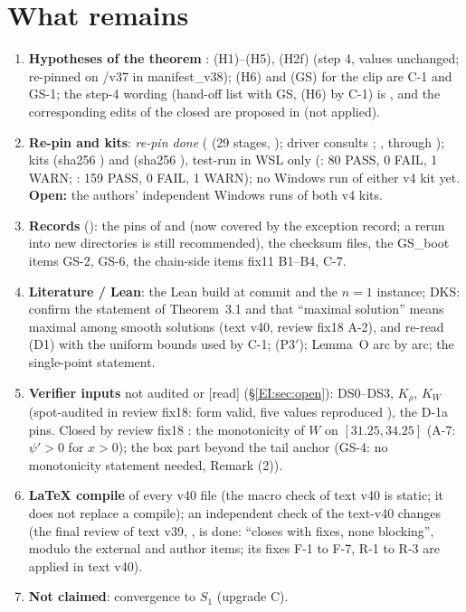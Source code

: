 \documentclass[11pt]{article}
\begin{document}
\section{What remains}\label{M:sec:remains}
\begin{enumerate}[leftmargin=*]
\item \textbf{Hypotheses of the theorem} \tH: (H1)--(H5), (H2f) (step 4, values unchanged; re-pinned on /v37 in manifest\_v38); (H6) and (GS) for the clip are C-1 and GS-1; the step-4 wording (hand-off list with GS, (H6) by C-1) is , and the corresponding edits of the closed  are proposed in  (not applied).
\item \textbf{Re-pin and kits}: \emph{re-pin done} ( (29 stages, ); driver  consults ; ,  through ); kits  (sha256 ) and  (sha256 ), test-run in WSL only (: 80 PASS, 0 FAIL, 1 WARN; : 159 PASS, 0 FAIL, 1 WARN); no Windows run of either v4 kit yet. \textbf{Open:} the authors' independent Windows runs of both v4 kits.
\item \textbf{Records} (): the pins of  and  (now covered by the exception record; a rerun into new directories is still recommended), the checksum files, the GS\_boot items GS-2, GS-6, the chain-side items fix11 B1--B4, C-7.
\item \textbf{Literature / Lean}: the Lean build at commit  and the $n=1$ instance; DKS: confirm the statement of Theorem~3.1 and that ``maximal solution'' means maximal among smooth solutions (text v40, review fix18 A-2), and re-read (D1) with the uniform bounds used by C-1; (P3$'$); Lemma~O arc by arc; the single-point statement.
\item \textbf{Verifier inputs} not audited or [read] (\S\ref{EI:sec:open}): DS0--DS3, $K_\rho$, $K_W$ (spot-audited in review fix18: form valid, five values reproduced \tHd), the D-1a pins. Closed by review fix18 \tHd: the monotonicity of $W$ on $[31.25,34.25]$ (A-7: $\psi'>0$ for $x>0$); the box part beyond the tail anchor (GS-4: no monotonicity statement needed,  Remark (2)).
\item \textbf{LaTeX compile} of every v40 file (the macro check of text v40 is static; it does not replace a compile); an independent check of the text-v40 changes (the final review of text v39, , is done: ``closes with fixes, none blocking'', modulo the external and author items; its fixes F-1 to F-7, R-1 to R-3 are applied in text v40).
\item \textbf{Not claimed}: convergence to $S_1$ (upgrade C).
\end{enumerate}
\end{document}
